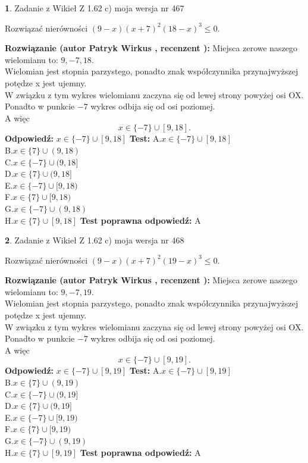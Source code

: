 \documentclass[12pt, a4paper]{article}
\theoremstyle{definition} %
\newtheorem{zad}{}
\newcommand{\zadStart}[1]{\begin{zad}#1\newline}
\newcommand{\zadStop}{\end{zad}}
\newcommand{\rozwStart}[2]{\noindent \textbf{Rozwiązanie (autor #1 , recenzent #2): }\newline}
\newcommand{\rozwStop}{\newline}
\newcommand{\odpStart}{\noindent \textbf{Odpowiedź:}\newline}
\newcommand{\odpStop}{\newline}
\newcommand{\testStart}{\noindent \textbf{Test:}\newline}
\newcommand{\testStop}{\newline}
\newcommand{\kluczStart}{\noindent \textbf{Test poprawna odpowiedź:}\newline}
\newcommand{\kluczStop}{\newline}
\begin{document}
\zadStart{Zadanie z Wikieł Z 1.62 c) moja wersja nr 467}

Rozwiązać nierówności $(9-x)(x+7)^{2}(18-x)^{3}\le0$.
\zadStop
\rozwStart{Patryk Wirkus}{}
Miejsca zerowe naszego wielomianu to: $9, -7, 18$.\\
Wielomian jest stopnia parzystego, ponadto znak współczynnika przy\linebreak najwyższej potędze x jest ujemny.\\ W związku z tym wykres wielomianu zaczyna się od lewej strony powyżej osi OX.\\
Ponadto w punkcie $-7$ wykres odbija się od osi poziomej.\\
A więc $$x \in \{-7\} \cup [9,18].$$
\rozwStop
\odpStart
$x \in \{-7\} \cup [9,18]$
\odpStop
\testStart
A.$x \in \{-7\} \cup [9,18]$\\
B.$x \in \{7\} \cup (9,18)$\\
C.$x \in \{-7\} \cup (9,18]$\\
D.$x \in \{7\} \cup (9,18]$\\
E.$x \in \{-7\} \cup [9,18)$\\
F.$x \in \{7\} \cup [9,18)$\\
G.$x \in \{-7\} \cup (9,18)$\\
H.$x \in \{7\} \cup [9,18]$
\testStop
\kluczStart
A
\kluczStop



\zadStart{Zadanie z Wikieł Z 1.62 c) moja wersja nr 468}

Rozwiązać nierówności $(9-x)(x+7)^{2}(19-x)^{3}\le0$.
\zadStop
\rozwStart{Patryk Wirkus}{}
Miejsca zerowe naszego wielomianu to: $9, -7, 19$.\\
Wielomian jest stopnia parzystego, ponadto znak współczynnika przy\linebreak najwyższej potędze x jest ujemny.\\ W związku z tym wykres wielomianu zaczyna się od lewej strony powyżej osi OX.\\
Ponadto w punkcie $-7$ wykres odbija się od osi poziomej.\\
A więc $$x \in \{-7\} \cup [9,19].$$
\rozwStop
\odpStart
$x \in \{-7\} \cup [9,19]$
\odpStop
\testStart
A.$x \in \{-7\} \cup [9,19]$\\
B.$x \in \{7\} \cup (9,19)$\\
C.$x \in \{-7\} \cup (9,19]$\\
D.$x \in \{7\} \cup (9,19]$\\
E.$x \in \{-7\} \cup [9,19)$\\
F.$x \in \{7\} \cup [9,19)$\\
G.$x \in \{-7\} \cup (9,19)$\\
H.$x \in \{7\} \cup [9,19]$
\testStop
\kluczStart
A
\kluczStop
\end{document}
